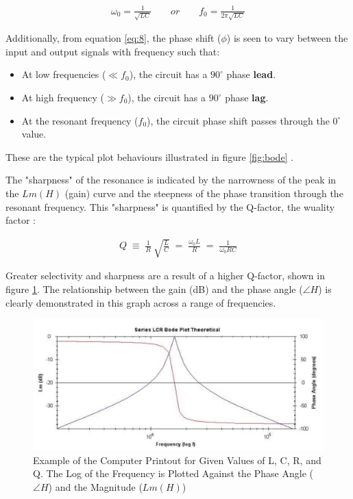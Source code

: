 \documentclass[12pt]{article}
\begin{document}
\begin{gather} \label{eq:9}
    \omega_0 = \frac{1}{\sqrt{LC}} \qquad or \qquad f_0 = \frac{1}{2 \pi \sqrt{LC}}
\end{gather}

Additionally, from equation \ref{eq:8}, the phase shift ($\phi$) is seen to vary between the input and output signals with frequency such that:

\begin{itemize}
    \item At low frequencies ($\ll f_0$), the circuit has a $90^{\circ}$ phase \textbf{lead}.
    \item At high frequency ($\gg f_0$), the circuit has a $90^{\circ}$ phase \textbf{lag}.
    \item At the resonant frequency ($f_0$), the circuit phase shift passes through the $0^{\circ}$ value.
\end{itemize}

These are the typical plot behaviours illustrated in figure \ref{fig:bode} \cite{UCDlcr}.

The "sharpness" of the resonance is indicated by the narrowness of the peak in the $Lm(H)$ (gain) curve and the steepness of the phase transition through the resonant frequency.
This "sharpness" is quantified by the Q-factor, the wuality factor \cite{UCDlcr}:

\begin{gather}
    Q \; \equiv \; \frac{1}{R} \: \sqrt{\frac{L}{C}} \; = \; \frac{\omega_0 L}{R} \; = \; \frac{1}{\omega_0 RC}
\end{gather}

Greater selectivity and sharpness are a result of a higher Q-factor, shown in figure \ref{fig:bode theory}. The relationship between the gain (dB) and the phase angle ($\angle H$) is
clearly demonstrated in this graph across a range of frequencies.

\begin{figure} [H]
    \centering
    \includegraphics[width=15cm]{bode theory.png}
    \caption{\centering \footnotesize{Example of the Computer Printout for Given Values of L, C, R, and Q. The Log of the Frequency is Plotted Against the Phase Angle ($\angle H$) and the Magnitude ($Lm(H)$) \protect\cite{UCDlcr}}}
    \label{fig:bode theory}
\end{figure}
\end{document}
